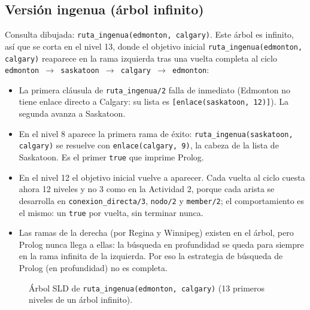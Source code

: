 \documentclass[12pt]{report}
\begin{document}
\subsection{Versión ingenua (árbol infinito)}

Consulta dibujada: \texttt{ruta\_ingenua(edmonton, calgary)}. Este árbol
es infinito, así que se corta en el nivel 13, donde el objetivo inicial
\texttt{ruta\_ingenua(edmonton, calgary)} reaparece en la rama izquierda
tras una vuelta completa al ciclo \texttt{edmonton $\to$ saskatoon
$\to$ calgary $\to$ edmonton}:

\begin{itemize}
    \item La primera cláusula de \texttt{ruta\_ingenua/2} falla de
          inmediato (Edmonton no tiene enlace directo a Calgary: su lista
          es \texttt{[enlace(saskatoon, 12)]}). La segunda avanza a
          Saskatoon.
    \item En el nivel 8 aparece la primera rama de éxito:
          \texttt{ruta\_ingenua(saskatoon, calgary)} se resuelve con
          \texttt{enlace(calgary, 9)}, la cabeza de la lista de Saskatoon.
          Es el primer \texttt{true} que imprime Prolog.
    \item En el nivel 12 el objetivo inicial vuelve a aparecer. Cada vuelta
          al ciclo cuesta ahora 12 niveles y no 3 como en la Actividad 2,
          porque cada arista se desarrolla en \texttt{conexion\_directa/3},
          \texttt{nodo/2} y \texttt{member/2}; el comportamiento es el
          mismo: un \texttt{true} por vuelta, sin terminar nunca.
    \item Las ramas de la derecha (por Regina y Winnipeg) existen en el
          árbol, pero Prolog nunca llega a ellas: la búsqueda en
          profundidad se queda para siempre en la rama infinita de la
          izquierda. Por eso la estrategia de búsqueda de Prolog (en
          profundidad) no es completa.
\end{itemize}
\begin{landscape}
\begin{figure}[p]
    \centering
    \caption{Árbol SLD de \texttt{ruta\_ingenua(edmonton, calgary)} (13 primeros niveles de un árbol infinito).}
\end{figure}
\end{landscape}

\newpage
\end{document}
